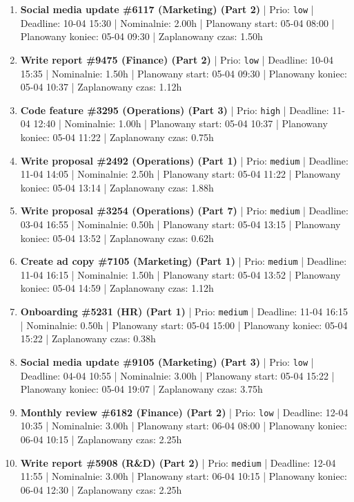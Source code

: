 {\begin{enumerate}
  \item [\textbf{14700}] \textbf{Social media update \#6117 (Marketing) (Part 2)} | Prio: \texttt{low} | Deadline: 10-04 15:30 | Nominalnie: 2.00h | Planowany start: 05-04 08:00 | Planowany koniec: 05-04 09:30 | Zaplanowany czas: 1.50h
  \item [\textbf{14685}] \textbf{Write report \#9475 (Finance) (Part 2)} | Prio: \texttt{low} | Deadline: 10-04 15:35 | Nominalnie: 1.50h | Planowany start: 05-04 09:30 | Planowany koniec: 05-04 10:37 | Zaplanowany czas: 1.12h
  \item [\textbf{14608}] \textbf{Code feature \#3295 (Operations) (Part 3)} | Prio: \texttt{high} | Deadline: 11-04 12:40 | Nominalnie: 1.00h | Planowany start: 05-04 10:37 | Planowany koniec: 05-04 11:22 | Zaplanowany czas: 0.75h
  \item [\textbf{14668}] \textbf{Write proposal \#2492 (Operations) (Part 1)} | Prio: \texttt{medium} | Deadline: 11-04 14:05 | Nominalnie: 2.50h | Planowany start: 05-04 11:22 | Planowany koniec: 05-04 13:14 | Zaplanowany czas: 1.88h
  \item [\textbf{14663}] \textbf{Write proposal \#3254 (Operations) (Part 7)} | Prio: \texttt{medium} | Deadline: 03-04 16:55 | Nominalnie: 0.50h | Planowany start: 05-04 13:15 | Planowany koniec: 05-04 13:52 | Zaplanowany czas: 0.62h
  \item [\textbf{14650}] \textbf{Create ad copy \#7105 (Marketing) (Part 1)} | Prio: \texttt{medium} | Deadline: 11-04 16:15 | Nominalnie: 1.50h | Planowany start: 05-04 13:52 | Planowany koniec: 05-04 14:59 | Zaplanowany czas: 1.12h
  \item [\textbf{14671}] \textbf{Onboarding \#5231 (HR) (Part 1)} | Prio: \texttt{medium} | Deadline: 11-04 16:15 | Nominalnie: 0.50h | Planowany start: 05-04 15:00 | Planowany koniec: 05-04 15:22 | Zaplanowany czas: 0.38h
  \item [\textbf{14698}] \textbf{Social media update \#9105 (Marketing) (Part 3)} | Prio: \texttt{low} | Deadline: 04-04 10:55 | Nominalnie: 3.00h | Planowany start: 05-04 15:22 | Planowany koniec: 05-04 19:07 | Zaplanowany czas: 3.75h
  \item [\textbf{14690}] \textbf{Monthly review \#6182 (Finance) (Part 2)} | Prio: \texttt{low} | Deadline: 12-04 10:35 | Nominalnie: 3.00h | Planowany start: 06-04 08:00 | Planowany koniec: 06-04 10:15 | Zaplanowany czas: 2.25h
  \item [\textbf{14674}] \textbf{Write report \#5908 (R\&D) (Part 2)} | Prio: \texttt{medium} | Deadline: 12-04 11:55 | Nominalnie: 3.00h | Planowany start: 06-04 10:15 | Planowany koniec: 06-04 12:30 | Zaplanowany czas: 2.25h

\end{enumerate}}
